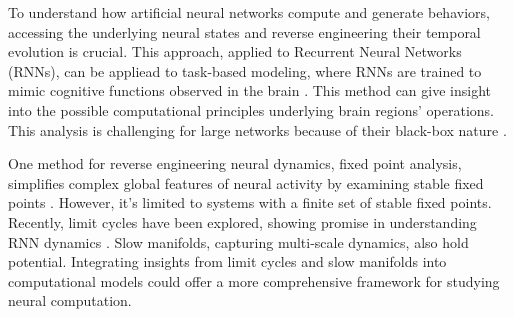 \documentclass[12pt,letterpaper, onecolumn]{article}
\theoremstyle{definition}
\theoremstyle{remark}
\begin{document}
To understand how artificial neural networks compute and generate behaviors, accessing the underlying neural states and reverse engineering their temporal evolution is crucial. This approach, applied to Recurrent Neural Networks (RNNs), can be appliead to task-based modeling, where RNNs are trained to mimic cognitive functions observed in the brain \citep{darshan2022, barak2017recurrent}. This method can give insight into the possible computational principles underlying brain regions' operations. This analysis is challenging for large networks because of their black-box nature \citep{lipton2018, erasmus2021}.


One method for reverse engineering neural dynamics, fixed point analysis, simplifies complex global features of neural activity by examining stable fixed points \citep{sussillo2013blackbox, sussillo2014, beer2018, maheswaranathan2019universality, driscoll2022}. However, it's limited to systems with a finite set of stable fixed points. Recently, limit cycles have been explored, showing promise in understanding RNN dynamics \citep{pals2024}. Slow manifolds, capturing multi-scale dynamics, also hold potential. Integrating insights from limit cycles and slow manifolds into computational models could offer a more comprehensive framework for studying neural computation.
\end{document}
